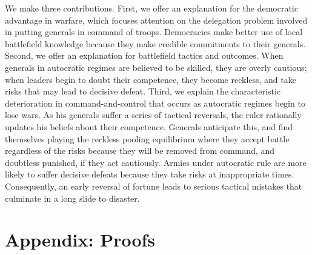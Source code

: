 \documentclass[11pt,]{article}
\begin{document}
We make three contributions.  First, we offer an explanation for the democratic advantage in warfare, which focuses attention on the delegation problem involved in putting generals in command of troops.  Democracies make better use of local battlefield knowledge because they make credible commitments to their generals. Second, we offer an explanation for battlefield tactics and outcomes.  When generals in autocratic regimes are believed to be skilled, they are overly cautious; when leaders begin to doubt their competence, they become reckless, and take risks that may lead to decisive defeat.  Third, we explain the characteristic deterioration in command-and-control that occurs as autocratic regimes begin to lose wars.  As his generals suffer a series of tactical reversals, the ruler rationally updates his beliefs about their competence.  Generals anticipate this, and find themselves playing the reckless pooling equilibrium where they accept battle regardless of the risks because they will be removed from command, and doubtless punished, if they act cautiously.  Armies under autocratic rule are more likely to suffer decisive defeats because they take risks at inappropriate times.   Consequently, an early reversal of fortune leads to serious tactical mistakes that culminate in a long slide to disaster.  %








\section*{Appendix: Proofs}
\end{document}
